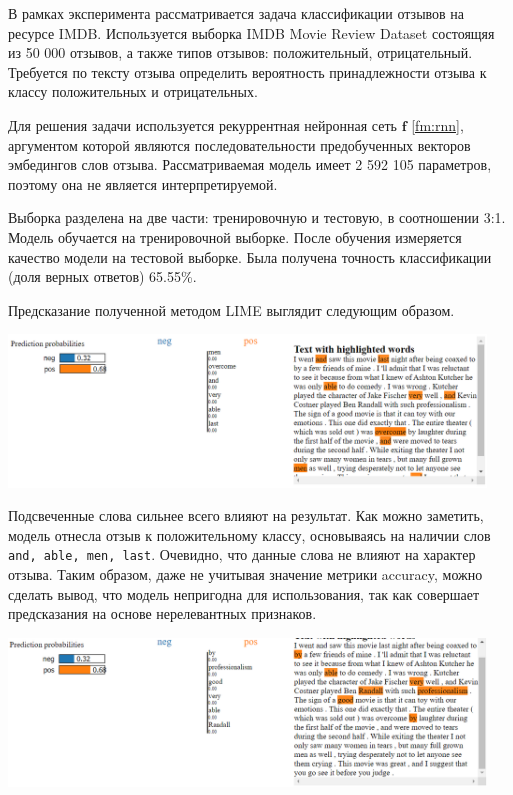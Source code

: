 \documentclass[a4paper, 12pt]{article}
\begin{document}
В рамках эксперимента рассматривается задача классификации отзывов на ресурсе IMDB. Используется выборка IMDB Movie Review Dataset \cite{maas-EtAl:2011:ACL-HLT2011} состоящяя из 50 000 отзывов, а также типов отзывов: положительный, отрицательный. Требуется по тексту отзыва определить вероятность принадлежности отзыва к классу положительных и отрицательных.

Для решения задачи используется рекуррентная нейронная сеть $\mathbf{f}$ \eqref{fm:rnn},
аргументом которой являются последовательности предобученных векторов эмбедингов слов отзыва. Рассматриваемая модель имеет 2 592 105 параметров, поэтому она не является интерпретируемой.

Выборка разделена на две части: тренировочную и тестовую, в соотношении 3:1. Модель обучается на тренировочной выборке. После обучения измеряется качество модели на тестовой выборке. Была получена точность классификации (доля верных ответов) 65.55\%.

Предсказание полученной методом LIME выглядит следующим образом.

\includegraphics[width=0.95\textwidth]{figures/lime_exp.png}

Подсвеченные слова сильнее всего влияют на результат. Как можно заметить, модель отнесла отзыв к положительному классу, основываясь на наличии слов \texttt{and, able, men, last}. Очевидно, что данные слова не влияют на характер отзыва. Таким образом, даже не учитывая значение метрики accuracy, можно сделать вывод, что модель непригодна для использования, так как совершает предсказания на основе нерелевантных признаков.

\includegraphics[width=0.95\textwidth]{figures/lime_exp2.png}
\end{document}
